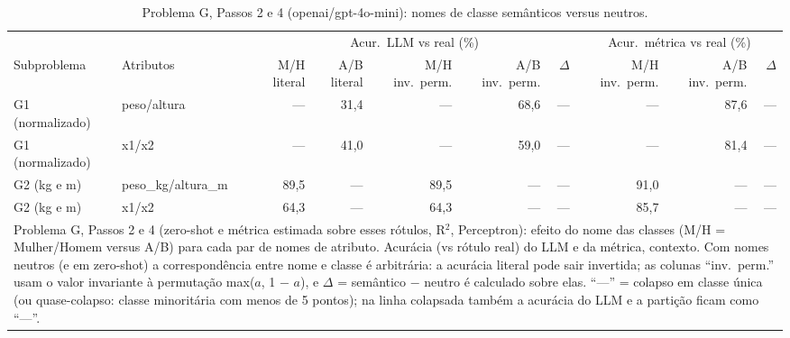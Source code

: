 \begin{table}[htbp]
\centering
\footnotesize
\caption{Problema G, Passos 2 e 4 (openai/gpt-4o-mini): nomes de classe semânticos versus neutros.}
\label{tab:bloco3_G_nomes_semanticos_vs_neutros_gpt4mini}
\begin{tabular}{llrrrrrrrr}
\toprule
 &  & \multicolumn{5}{c}{Acur.\ LLM vs real (\%)} & \multicolumn{3}{c}{Acur.\ métrica vs real (\%)} \\ \cmidrule(lr){3-7} \cmidrule(lr){8-10}
Subproblema & Atributos & M/H literal & A/B literal & M/H inv.\ perm. & A/B inv.\ perm. & $\Delta$ & M/H inv.\ perm. & A/B inv.\ perm. & $\Delta$ \\
\midrule
G1 (normalizado) & peso/altura & — & 31,4 & — & 68,6 & — & — & 87,6 & — \\
G1 (normalizado) & x1/x2 & — & 41,0 & — & 59,0 & — & — & 81,4 & — \\
\midrule
G2 (kg e m) & peso\_kg/altura\_m & 89,5 & — & 89,5 & — & — & 91,0 & — & — \\
G2 (kg e m) & x1/x2 & 64,3 & — & 64,3 & — & — & 85,7 & — & — \\
\bottomrule
\multicolumn{10}{p{0.95\linewidth}}{\footnotesize Problema G, Passos 2 e 4 (zero-shot e métrica estimada sobre esses rótulos, R$^2$, Perceptron): efeito do nome das classes (M/H = Mulher/Homem versus A/B) para cada par de nomes de atributo. Acurácia (vs rótulo real) do LLM e da métrica, contexto. Com nomes neutros (e em zero-shot) a correspondência entre nome e classe é arbitrária: a acurácia literal pode sair invertida; as colunas ``inv.\ perm.'' usam o valor invariante à permutação max($a$, 1 $-$ $a$), e $\Delta$ = semântico $-$ neutro é calculado sobre elas. ``—'' = colapso em classe única (ou quase-colapso: classe minoritária com menos de 5 pontos); na linha colapsada também a acurácia do LLM e a partição ficam como ``—''.} \\
\end{tabular}
\end{table}
